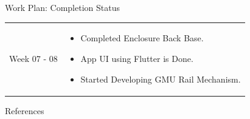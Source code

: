 \documentclass{beamer}
\begin{document}
\begin{frame} {Work Plan: Completion Status}
\begin{tabularx} {\textwidth} {
            >{\bfseries \raggedright \arraybackslash}m{2cm} >{\raggedright \arraybackslash}X
        }
        Week 07 - 08
        &
        \vspace{-0.35cm}
        \begin{itemize}
            \item Completed Enclosure Back Base.
            \item App UI using Flutter is Done.
            \item Started Developing GMU Rail Mechanism.
        \end{itemize}

        \\

    \end{tabularx}

\end{frame}

\begin{frame}[allowframebreaks] {References}

    \nocite{interEsp, ieeeComp, ieeeGreenAI, tinymlEnv, ieee01africa, microclimate, fruitfly, espGreen, ieee02, tinyml2}

    \nopagebreak

    \begingroup \let\clearpage\relax
    \printbibliography[heading = none] %
    \endgroup

\end{frame}
\end{document}
